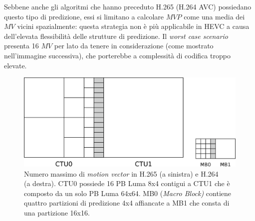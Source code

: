Sebbene anche gli algoritmi che hanno preceduto H.265 (H.264 AVC) %
possiedano questo 
tipo di predizione, essi si limitano a calcolare $MVP$ come una media dei $MV$ 
vicini spazialmente: questa strategia non è più applicabile in HEVC a causa 
dell'elevata flessibilità delle strutture di predizione.
Il \emph{worst case scenario} presenta 16 $MV$ per lato da tenere in 
considerazione (come mostrato nell'immagine successiva), che porterebbe a 
complessità di codifica troppo elevate.

\begin{figure}[H]
  \captionsetup{justification=raggedright}
  \centering
  \includegraphics[scale=0.45]{Figures/Inter_pred_2}
    \caption[Numero massimo di \emph{motion vector} in H.265 e H.264]
    {Numero massimo di \emph{motion vector} in H.265 (a sinistra) e H.264 \\
      (a destra). CTU0 possiede 16 PB Luma 8x4 contigui a CTU1 che è composto da
      un solo PB Luma 64x64. MB0 (\emph{Macro Block)} contiene quattro 
      partizioni di predizione 4x4 affiancate a MB1 che consta di una 
      partizione 16x16. }
\end{figure}

